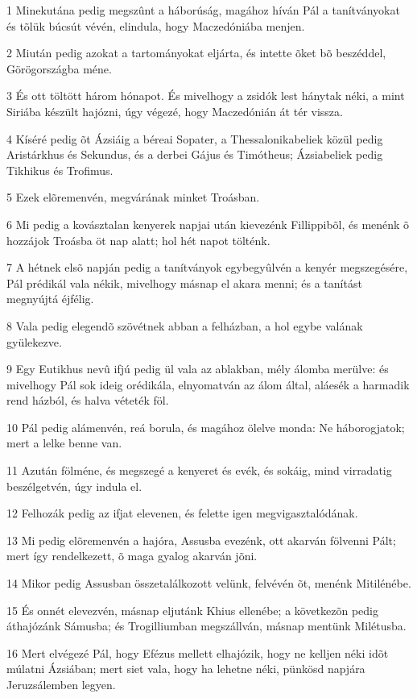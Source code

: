 \par 1 Minekutána pedig megszûnt a háborúság, magához híván Pál a tanítványokat és tõlük búcsút vévén, elindula, hogy Maczedóniába menjen.
\par 2 Miután pedig azokat a tartományokat eljárta, és intette õket bõ beszéddel, Görögországba méne.
\par 3 És ott töltött három hónapot. És mivelhogy a zsidók lest hánytak néki, a mint Siriába készült hajózni, úgy végezé, hogy Maczedónián át tér vissza.
\par 4 Kíséré pedig õt Ázsiáig a béreai Sopater,  a Thessalonikabeliek közül pedig Aristárkhus és Sekundus, és a derbei Gájus és Timótheus; Ázsiabeliek pedig Tikhikus  és Trofimus.
\par 5 Ezek elõremenvén, megvárának minket Troásban.
\par 6 Mi pedig a kovásztalan kenyerek napjai után kievezénk Fillippibõl, és menénk õ hozzájok Troásba öt nap alatt; hol hét napot tölténk.
\par 7 A hétnek elsõ napján pedig a tanítványok egybegyûlvén a kenyér megszegésére, Pál prédikál vala nékik, mivelhogy másnap el akara menni; és a tanítást megnyújtá éjfélig.
\par 8 Vala pedig elegendõ szövétnek abban a felházban, a hol egybe valának gyülekezve.
\par 9 Egy Eutikhus nevû ifjú pedig ül vala az ablakban, mély álomba merülve: és mivelhogy Pál sok ideig orédikála, elnyomatván az álom által, aláesék a harmadik rend házból, és halva véteték föl.
\par 10 Pál pedig alámenvén, reá borula, és magához ölelve monda: Ne háborogjatok; mert a lelke benne van.
\par 11 Azután fölméne, és megszegé a kenyeret és evék, és sokáig, mind virradatig beszélgetvén, úgy indula el.
\par 12 Felhozák pedig az ifjat elevenen, és felette igen megvigasztalódának.
\par 13 Mi pedig elõremenvén a hajóra, Assusba evezénk, ott akarván fölvenni Pált; mert így rendelkezett, õ maga gyalog akarván jõni.
\par 14 Mikor pedig Assusban összetalálkozott velünk, felvévén õt, menénk Mitilénébe.
\par 15 És onnét elevezvén, másnap eljutánk Khius ellenébe; a következõn pedig áthajózánk Sámusba; és Trogilliumban megszállván, másnap mentünk Milétusba.
\par 16 Mert elvégezé Pál, hogy Efézus mellett elhajózik, hogy ne kelljen néki idõt múlatni Ázsiában; mert siet vala, hogy ha lehetne néki, pünkösd napjára Jeruzsálemben legyen.
